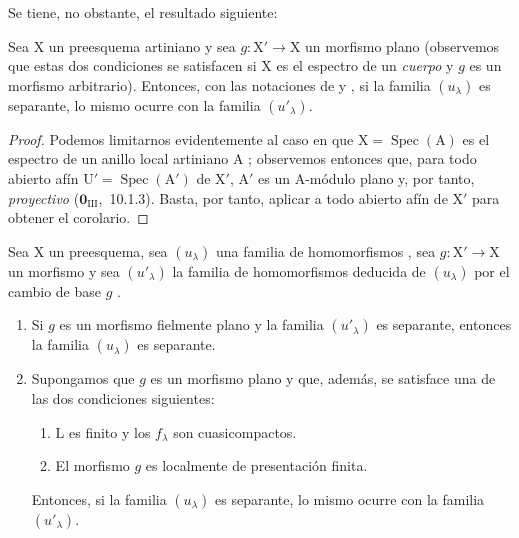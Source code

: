 Se tiene, no obstante, el resultado siguiente:

\begin{corollary}[11.9.9]
\label{IV.11.9.9}
Sea $\mathrm{X}$ un preesquema artiniano y sea $g:\mathrm{X}'\to\mathrm{X}$ un morfismo plano (observemos que estas dos condiciones se satisfacen si $\mathrm{X}$ es el espectro de un \emph{cuerpo} y $g$ es un morfismo arbitrario).
Entonces, con las notaciones de  y , si la familia $(u_\lambda)$ es separante, lo mismo ocurre con la familia $(u'_\lambda)$.
\end{corollary}

\begin{proof}
Podemos limitarnos evidentemente al caso en que $\mathrm{X}=\operatorname{Spec}(\mathrm{A})$ es el espectro de un anillo local artiniano $\mathrm{A}$ ; observemos entonces que, para todo abierto afín $\mathrm{U}'=\operatorname{Spec}(\mathrm{A}')$ de $\mathrm{X}'$, $\mathrm{A}'$ es un $\mathrm{A}$-módulo plano y, por tanto, \emph{proyectivo} ($\mathbf{0}_{\mathrm{III}}$,~10.1.3).
Basta, por tanto, aplicar  a todo abierto afín de $\mathrm{X}'$ para obtener el corolario.
\end{proof}

\begin{theorem}[11.9.10]
\label{IV.11.9.10}
Sea $\mathrm{X}$ un preesquema, sea $(u_\lambda)$ una familia de homomorfismos , sea $g:\mathrm{X}'\to\mathrm{X}$ un morfismo y sea $(u'_\lambda)$ la familia de homomorfismos deducida de $(u_\lambda)$ por el cambio de base $g$ .
\begin{enumerate}[label=(\roman*)]
  \item Si $g$ es un morfismo fielmente plano y la familia $(u'_\lambda)$ es separante, entonces la familia $(u_\lambda)$ es separante.
  \item Supongamos que $g$ es un morfismo plano y que, además, se satisface una de las dos condiciones siguientes:
  \begin{enumerate}[label=\emph{\alph*)}]
    \item $\mathrm{L}$ es finito y los $f_\lambda$ son cuasicompactos.
    \item El morfismo $g$ es localmente de presentación finita.
  \end{enumerate}
  Entonces, si la familia $(u_\lambda)$ es separante, lo mismo ocurre con la familia $(u'_\lambda)$.
\end{enumerate}
\end{theorem}

